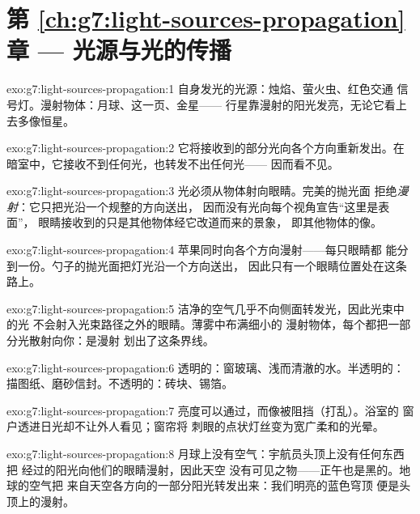 \section*{第 \ref{ch:g7:light-sources-propagation} 章 --- 光源与光的传播}

\begin{solution}{exo:g7:light-sources-propagation:1}
自身发光的光源：烛焰、萤火虫、红色交通
信号灯。漫射物体：月球、这一页、金星——
行星靠漫射的阳光发亮，无论它看上去多像恒星。
\end{solution}

\begin{solution}{exo:g7:light-sources-propagation:2}
它将接收到的部分光向各个方向重新发出。在
暗室中，它接收不到任何光，也转发不出任何光——
因而看不见。
\end{solution}

\begin{solution}{exo:g7:light-sources-propagation:3}
光必须从物体射向眼睛。完美的抛光面
拒绝\emph{漫射}：它只把光沿一个规整的方向送出，
因而没有光向每个视角宣告“这里是表面”，
眼睛接收到的只是其他物体经它改道而来的景象，
即其他物体的像。
\end{solution}

\begin{solution}{exo:g7:light-sources-propagation:4}
苹果同时向各个方向漫射——每只眼睛都
能分到一份。勺子的抛光面把灯光沿一个方向送出，
因此只有一个眼睛位置处在这条路上。
\end{solution}

\begin{solution}{exo:g7:light-sources-propagation:5}
洁净的空气几乎不向侧面转发光，因此光束中的光
不会射入光束路径之外的眼睛。薄雾中布满细小的
漫射物体，每个都把一部分光散射向你：是漫射
划出了这条界线。
\end{solution}

\begin{solution}{exo:g7:light-sources-propagation:6}
透明的：窗玻璃、浅而清澈的水。半透明的：
描图纸、磨砂信封。不透明的：砖块、锡箔。
\end{solution}

\begin{solution}{exo:g7:light-sources-propagation:7}
亮度可以通过，而像被阻挡（打乱）。浴室的
窗户透进日光却不让外人看见；窗帘将
刺眼的点状灯丝变为宽广柔和的光晕。
\end{solution}

\begin{solution}{exo:g7:light-sources-propagation:8}
月球上没有空气：宇航员头顶上没有任何东西把
经过的阳光向他们的眼睛漫射，因此天空
没有可见之物——正午也是黑的。地球的空气把
来自天空各方向的一部分阳光转发出来：我们明亮的蓝色穹顶
便是头顶上的漫射。
\end{solution}

